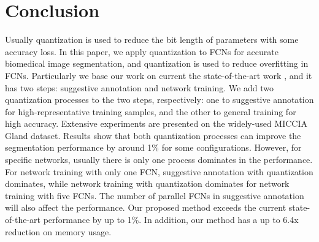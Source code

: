 \documentclass[10pt,twocolumn,letterpaper]{article}
\begin{document}




\section{Conclusion}
Usually quantization is used to reduce the bit length of parameters with some accuracy loss.
In this paper, we apply quantization to FCNs for accurate biomedical image segmentation, and quantization is used to reduce overfitting in FCNs.
Particularly we base our work on current the state-of-the-art work \cite{yang2017suggestive}, and it has two steps: suggestive annotation and network training.
We add two quantization processes to the two steps, respectively: one to suggestive annotation for high-representative training samples, and the other to general training for high accuracy.
Extensive experiments are presented on the widely-used MICCIA Gland dataset.
Results show that both quantization processes can improve the segmentation performance by around 1\% for some configurations.
However, for specific networks, usually there is only one process dominates in the performance.
For network training with only one FCN, suggestive annotation with quantization dominates, while network training with quantization dominates for network training with five FCNs.
The number of parallel FCNs in suggestive annotation will also affect the performance.
Our proposed method exceeds the current state-of-the-art performance by up to 1\%.
In addition, our method has a up to 6.4x reduction on memory usage.


%
\end{document}
